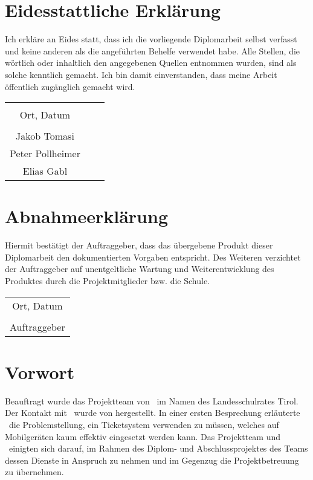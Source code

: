 \chapter*{Eidesstattliche Erklärung}
Ich erkläre an Eides statt, dass ich die vorliegende Diplomarbeit selbst verfasst und keine anderen als die angeführten Behelfe verwendet habe. Alle Stellen, die wörtlich oder inhaltlich den angegebenen Quellen entnommen wurden, sind als solche kenntlich gemacht.
Ich bin damit einverstanden, dass meine Arbeit öffentlich zugänglich gemacht wird.

\vspace{1cm}
\begin{tabular}{c c c}
	& \hspace{4cm} & \\\cline{1-1}
	Ort, Datum & & \\
	\vspace{2cm}
	& & \\\cline{1-1}
	Jakob Tomasi
	\vspace{2cm}
	& & \\\cline{1-1}
	Peter Pollheimer
	\vspace{2cm}
	& & \\\cline{1-1}
	Elias Gabl 
\end{tabular}

\chapter*{Abnahmeerklärung}
Hiermit bestätigt der Auftraggeber, dass das übergebene Produkt dieser Diplomarbeit den dokumentierten Vorgaben entspricht. Des Weiteren verzichtet der Auftraggeber auf unentgeltliche Wartung und Weiterentwicklung des Produktes durch die Projektmitglieder bzw. die Schule.

\vspace{1cm}
\begin{tabular}{c}
	\\\cline{1-1}
	Ort, Datum\\
	\vspace{2cm}
	\\\cline{1-1}
	Auftraggeber
\end{tabular}	

\chapter*{Vorwort}
Beauftragt wurde das Projektteam von \getHammerl\ im Namen des Landesschulrates Tirol. Der Kontakt mit \getHammerl\ wurde von \getAlex hergestellt. In einer ersten Besprechung erläuterte \getHammerl\ die Problemstellung, ein Ticketsystem verwenden zu müssen, welches auf Mobilgeräten kaum effektiv eingesetzt werden kann. Das Projektteam und \getHammerl\ einigten sich darauf, im Rahmen des Diplom- und Abschlussprojektes des Teams dessen Dienste in Anspruch zu nehmen und im Gegenzug die Projektbetreuung zu übernehmen.



